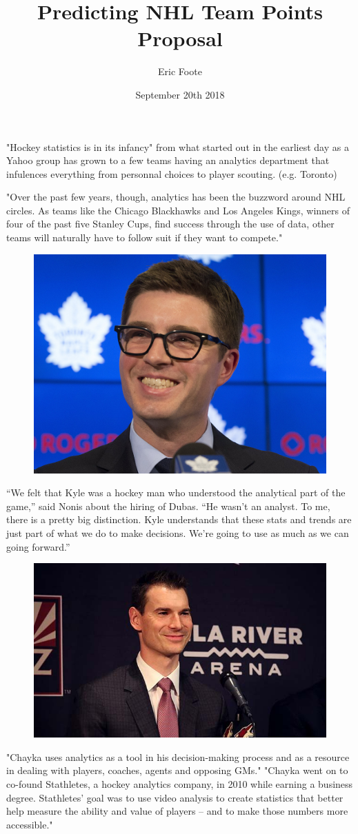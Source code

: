 \documentclass{beamer}
\title{Predicting NHL Team Points Proposal}
\author{Eric Foote}
\institute{UNBSJ}
\date{September 20th 2018}
\begin{document}
	
	\begin{frame}
		\titlepage
	\end{frame}
	
	\begin{frame}
	"Hockey statistics is in its infancy"\cite{Weissbock} from what started out in the earliest day as a Yahoo group\cite{Vollman} has grown to a few teams having an analytics department that infulences everything from personnal choices to player scouting. (e.g. Toronto)
	\end{frame}
	
	\begin{frame}
	"Over the past few years, though, analytics has been the buzzword around NHL circles. As teams like the Chicago Blackhawks and Los Angeles Kings, winners 
	of four of the past five Stanley Cups, find success through the use of data, other teams will naturally have to follow suit if they want to compete." \cite{Forbes}
	\end{frame}
	
	\begin{frame}
	
	\begin{figure}	
		\includegraphics[width=0.2\linewidth]{Images/kyle-dubas}
    \end{figure}
	“We felt that Kyle was a hockey man who understood the analytical part of the game,” said Nonis about the hiring of Dubas. “He wasn’t an analyst. To me, there is a pretty big distinction. Kyle understands that these stats and trends are just part of what we do to make decisions. We’re going to use as much as we can going forward.” \cite{Forbes}
	\end{frame}
	
	\begin{frame}
	
	\begin{figure}	
			\includegraphics[width=0.2\linewidth]{Images/chakya-12-13-620x370}
	\end{figure}
	"Chayka uses analytics as a tool in his decision-making process and as a resource in dealing with players, coaches, agents and opposing GMs." \cite{Chyka}
	"Chayka went on to co-found Stathletes, a hockey analytics company, in 2010 while earning a business degree. Stathletes' goal was to use video analysis to create statistics that better help measure the ability and value of players -- and to make those numbers more accessible." \cite{Chyka}
	\end{frame}
	
\end{document}
